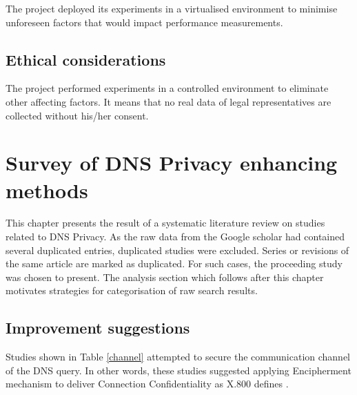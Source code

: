 \documentclass[a4paper,12pt]{article}
\begin{document}
The project deployed its experiments in a virtualised environment to minimise unforeseen factors that would impact performance measurements.

\subsection{Ethical considerations}
The project performed experiments in a controlled environment to eliminate other affecting factors. It means that no real data of legal representatives are collected without his/her consent. 

\newpage
\section{Survey of DNS Privacy enhancing methods}
This chapter presents the result of a systematic literature review on studies related to DNS Privacy.
As the raw data from the Google scholar had contained several duplicated entries, duplicated studies were excluded. Series or revisions of the same article are marked as duplicated. For such cases, the proceeding study was chosen to present.
The analysis section which follows after this chapter motivates strategies for categorisation of raw search results.

\subsection{Improvement suggestions}
Studies shown in Table \ref{channel} attempted to secure the communication channel of the DNS query. In other words, these studies suggested applying Encipherment mechanism to deliver Connection Confidentiality as X.800 defines \cite{x800}.
\end{document}
